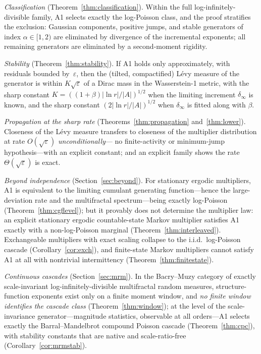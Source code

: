 \documentclass[12pt]{amsart}
\theoremstyle{definition}
\theoremstyle{remark}
\begin{document}
\emph{Classification}
(Theorem~\ref{thm:classification}).  Within the full
log-infinitely-divisible family, A1 selects exactly the log-Poisson
class, and the proof stratifies the exclusion: Gaussian components,
positive jumps, and stable generators of index $\alpha \in [1,2)$ are
eliminated by divergence of the incremental exponents; all remaining
generators are eliminated by a second-moment rigidity.

\emph{Stability}
(Theorem~\ref{thm:stability}).  If A1 holds only approximately, with
residuals bounded by~$\varepsilon$, then the (tilted, compactified)
L\'evy measure of the generator is within $K\sqrt{\varepsilon}$ of a
Dirac mass in the Wasserstein-1 metric, with the sharp constant
$K = ((1+\beta)|\ln r|/|A|)^{1/2}$ when the limiting increment
$\delta_\infty$ is known, and the sharp constant
$(2|\ln r|/|A|)^{1/2}$ when $\delta_\infty$ is fitted along with
$\beta$.

\emph{Propagation at the sharp rate}
(Theorems~\ref{thm:propagation} and~\ref{thm:lower}).  Closeness of
the L\'evy measure transfers to closeness of the multiplier
distribution at rate $O(\sqrt\varepsilon)$ \emph{unconditionally}---%
no finite-activity or minimum-jump hypothesis---with an explicit
constant; and an explicit family shows the rate
$\Theta(\sqrt\varepsilon)$ is exact.

\emph{Beyond independence}
(Section~\ref{sec:beyond}).  For stationary ergodic multipliers, A1
is equivalent to the limiting cumulant generating function---hence
the large-deviation rate and the multifractal spectrum---being
exactly log-Poisson (Theorem~\ref{thm:cgflevel}); but it provably
does not determine the multiplier law: an explicit stationary
ergodic countable-state Markov multiplier satisfies A1 exactly with
a non-log-Poisson marginal (Theorem~\ref{thm:interleaved}).
Exchangeable multipliers with exact scaling collapse to the i.i.d.\
log-Poisson cascade (Corollary~\ref{cor:exch}), and finite-state
Markov multipliers cannot satisfy A1 at all with nontrivial
intermittency (Theorem~\ref{thm:finitestate}).

\emph{Continuous cascades}
(Section~\ref{sec:mrm}).  In the Bacry--Muzy category of exactly
scale-invariant log-infinitely-divisible multifractal random
measures, structure-function exponents exist only on a finite moment
window, and \emph{no finite window identifies the cascade class}
(Theorem~\ref{thm:window}); at the level of the scale-invariance
generator---magnitude statistics, observable at all orders---A1
selects exactly the Barral--Mandelbrot compound Poisson cascade
(Theorem~\ref{thm:cpc}), with stability constants that are native
and scale-ratio-free (Corollary~\ref{cor:mrmstab}).
\end{document}
